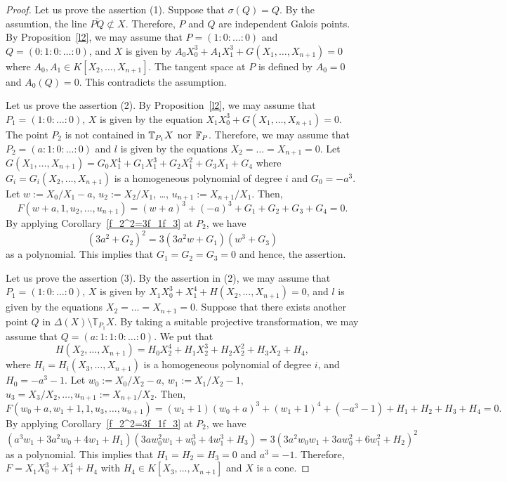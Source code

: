 \documentclass[10pt,oneside]{amsart}
\theoremstyle{definition}
\begin{document}
\begin{proof}
Let us prove the assertion (1). 
Suppose that $\sigma(Q)=Q$. 
By the assumtion, the line $\overline{PQ} \not \subset X$. 
Therefore, $P$ and $Q$ are independent Galois points. 
By Proposition~\ref{l2}, we may assume that $P=(1:0: \dots :0)$ and $Q=(0:1:0:\dots:0)$, and $X$ is given by $A_0X_{0}^3+A_1X_1^3+G(X_1,\dots,X_{n+1})=0$ where $A_0, A_1 \in K[X_2, \ldots, X_{n+1}]$. 
The tangent space at $P$ is defined by $A_0=0$ and $A_0(Q)=0$. 
This contradicts the assumption. 

Let us prove the assertion (2). 
By Proposition~\ref{l2}, we may assume that $P_1=(1:0:\dots:0)$, $X$ is given by the equation $X_1X_{0}^3+G(X_1,\dots,X_{n+1})=0$. 
The point $P_2$ is not contained in $\Bbb T_{P_1}X$ nor $\Bbb F_P$. 
Therefore, we may assume that $P_2=(a:1:0:\dots:0)$ and $l$ is given by the equations $X_2= \dots = X_{n+1}=0$. 
Let $G(X_1,\dots,X_{n+1})=G_0 X_1^4 + G_1 X_1^3 + G_2 X_1^2 + G_3 X_1+ G_4$
where $G_i=G_i(X_2,\dots,X_{n+1})$ is a homogeneous polynomial of degree $i$ and $G_0=-a^3$. 
Let $w:=X_0/X_1-a$, $u_2:=X_2/X_1$, \ldots, $u_{n+1}:=X_{n+1}/X_1$. 
Then, $$F(w+a,1,u_2, \ldots, u_{n+1})=(w+a)^3+(-a)^3+G_1+G_2+G_3+G_4=0. $$
By applying Corollary~\ref{f_2^2=3f_1f_3} at $P_2$, we have 
$$ (3a^2+G_2)^2=3(3a^2w+G_1)(w^3+G_3) $$
as a polynomial. 
This implies that $G_1=G_2=G_3=0$ and hence, the assertion. 

Let us prove the assertion (3). 
By the assertion in (2), we may assume that $P_1=(1:0: \dots :0)$, $X$ is given by $X_1X_{0}^3+X_1^4+H(X_2,\dots,X_{n+1})=0$, and $l$ is given by the equations $X_2= \dots = X_{n+1}=0$. 
Suppose that there exists another point $Q$ in $\Delta(X) \setminus \mathbb{T}_{P_1}X$. 
By taking a suitable projective transformation, we may assume that $Q=(a:1:1:0:\dots:0)$. We put that 
$$H(X_2,\dots,X_{n+1})=H_0 X_{2}^4 + H_1 X_{2}^3 + H_2 X_{2}^2 + H_3 X_{2}+ H_4,$$
where $H_i=H_i(X_3, \dots,X_{n+1})$ is a homogeneous polynomial of degree $i$, and $H_0=-a^3-1$. 
Let $w_0:=X_0/X_2-a$, $w_1:=X_1/X_2-1$, $u_3=X_3/X_2, \ldots, u_{n+1}:=X_{n+1}/X_2$. 
Then, $$ F(w_0+a, w_1+1, 1, u_3, \ldots, u_{n+1})=(w_1+1)(w_0+a)^3+(w_1+1)^4+(-a^3-1)+H_1+H_2+H_3+H_4=0. $$
By applying Corollary~\ref{f_2^2=3f_1f_3} at $P_2$, we have 
$$ (a^3w_1+3a^2w_0+4w_1+H_1)(3aw_0^2w_1+w_0^3+4w_1^3+H_3)=3(3a^2w_0w_1+3aw_0^2+6w_1^2+H_2)^2 $$
as a polynomial. 
This implies that $H_1=H_2=H_3=0$ and $a^3=-1$. 
Therefore, $F=X_1X_0^3+X_1^4+H_4$ with $H_4 \in K[X_3, \ldots, X_{n+1}]$ and $X$ is a cone. 
\end{proof}
\end{document}
